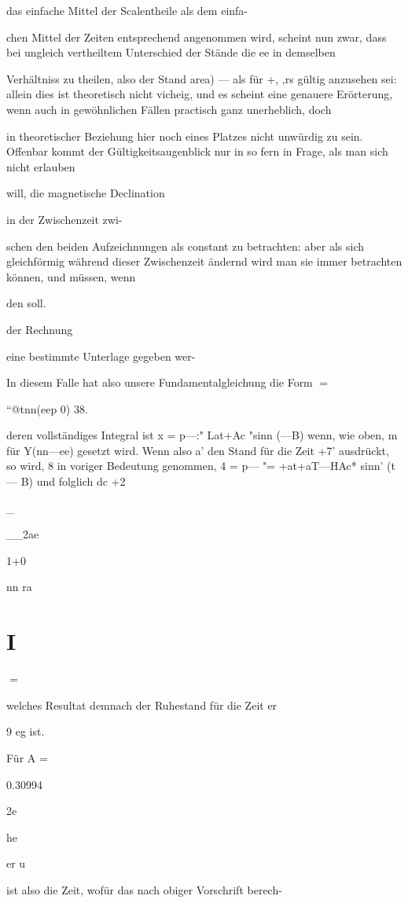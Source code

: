 \documentclass[12pt,a4paper]{article}
\begin{document}
das einfache Mittel der Scalentheile als dem einfa-

chen Mittel der Zeiten entsprechend angenommen wird, scheint nun zwar, dass bei ungleich vertheiltem Unterschied der Stände die ee in demselben

Verhältniss zu theilen, also der Stand area) — als für +, ‚rs gültig anzusehen sei: allein dies ist theoretisch nicht vicheig, und es scheint eine genauere Erörterung, wenn auch in gewöhnlichen Fällen practisch ganz unerheblich, doch

in theoretischer Beziehung hier noch eines Platzes nicht unwürdig zu sein. Offenbar kommt der Gültigkeitsaugenblick nur in so fern in Frage, als man sich nicht erlauben

will, die magnetische Declination

in der Zwischenzeit zwi-

schen den beiden Aufzeichnungen als constant zu betrachten: aber als sich gleichförmig während dieser Zwischenzeit ändernd wird man sie immer betrachten können, und müssen, wenn

den soll.

der Rechnung

eine bestimmte Unterlage gegeben wer-

In diesem Falle hat also unsere Fundamentalgleichung die Form $=$

“@tnn(eep 0) 38.

deren vollständiges Integral ist x = p—:" Lat+Ac "sinn (—B) wenn, wie oben, m für Y(nn—ee) gesetzt wird. Wenn also a’ den Stand für die Zeit +7’ ausdrückt, so wird, 8 in voriger Bedeutung genommen, 4 = p— "= +at+aT—HAc* sinn’ (t— B) und folglich dc +2

\_

\_\_2ae

1+0

nn ra

\section*{I}
$=$

welches Resultat demnach der Ruhestand für die Zeit er

9 eg ist.

Für A =

0.30994

2e

he

er u

ist also die Zeit, wofür das nach obiger Vorschrift berech-
\end{document}
